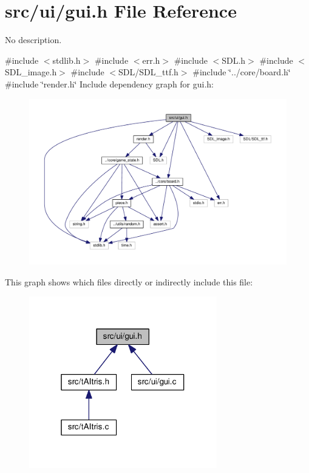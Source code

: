 \section{src/ui/gui.h File Reference}
\label{gui_8h}


No description.  


{\ttfamily \#include $<$stdlib.\+h$>$}\newline
{\ttfamily \#include $<$err.\+h$>$}\newline
{\ttfamily \#include $<$S\+D\+L.\+h$>$}\newline
{\ttfamily \#include $<$S\+D\+L\+\_\+image.\+h$>$}\newline
{\ttfamily \#include $<$S\+D\+L/\+S\+D\+L\+\_\+ttf.\+h$>$}\newline
{\ttfamily \#include \char`\"{}../core/board.\+h\char`\"{}}\newline
{\ttfamily \#include \char`\"{}render.\+h\char`\"{}}\newline
Include dependency graph for gui.\+h\+:
\nopagebreak
\begin{figure}[H]
\begin{center}
\leavevmode
\includegraphics[width=350pt]{gui_8h__incl}
\end{center}
\end{figure}
This graph shows which files directly or indirectly include this file\+:
\nopagebreak
\begin{figure}[H]
\begin{center}
\leavevmode
\includegraphics[width=232pt]{gui_8h__dep__incl}
\end{center}
\end{figure}
